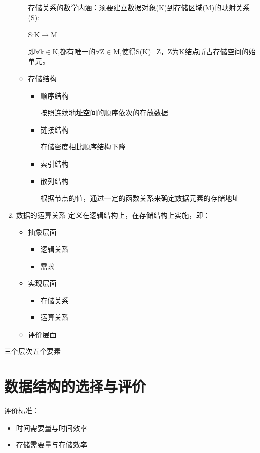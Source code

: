 \documentclass[AutoFakeBold]{LZUThesis2007}
\begin{document}
\begin{enumerate}
\begin{itemize}
							存储关系的数学内涵：须要建立数据对象(K)到存储区域(M)的映射关系(S):

							S:K$\rightarrow$M

							即$\forall \mathrm{k} \in \mathrm{K}$,都有唯一的$\forall \mathrm{Z} \in \mathrm{M}$,使得S(K)=Z，Z为K结点所占存储空间的始单元。

	
				\item  存储结构
					\begin{itemize}
						\item  顺序结构
			
									按照连续地址空间的顺序依次的存放数据
			
						\item  链接结构

									存储密度相比顺序结构下降

						\item  索引结构
						\item  散列结构

									根据节点的值，通过一定的函数关系来确定数据元素的存储地址

					\end{itemize}
			\end{itemize}
	\item 数据的运算关系
				定义在逻辑结构上，在存储结构上实施，即：
				\begin{itemize}
					\item  抽象层面
						\begin{itemize}
							\item 逻辑关系
							\item 需求
						\end{itemize}
					\item  实现层面
						\begin{itemize}
							\item 存储关系
							\item 运算关系
						\end{itemize}
					\item  评价层面
				\end{itemize}
\end{enumerate}

三个层次五个要素

	\section{数据结构的选择与评价}
		评价标准：
			\begin{itemize}
				\item 时间需要量与时间效率
				\item 存储需要量与存储效率
			\end{itemize}
\end{document}
